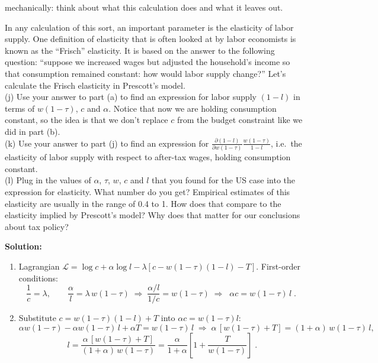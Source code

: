 \documentclass[12pt, letterpaper]{article}
\begin{document}
\begin{tcolorbox}[oddbox,title={Problem 7.5 \quad Prescott's Calculation}]
\begin{tcolorbox}[questionbox]
mechanically: think about what this calculation does and what it leaves out.
\end{tcolorbox}
\begin{tcolorbox}[questionbox,title={\textit{Question (continued)}}]
In any calculation of this sort, an important parameter is the elasticity of labor supply.
One definition of elasticity that is often looked at by labor economists is known as the
``Frisch'' elasticity. It is based on the answer to the following question: ``suppose we
increased wages but adjusted the household's income so that consumption remained constant:
how would labor supply change?'' Let's calculate the Frisch elasticity in Prescott's model.\\[3pt]
(j) Use your answer to part (a) to find an expression for labor supply $(1-l)$ in terms of
$w(1-\tau)$, $c$ and $\alpha$. Notice that now we are holding consumption constant, so the
idea is that we don't replace $c$ from the budget constraint like we did in part (b).\\
(k) Use your answer to part (j) to find an expression for
$\frac{\partial(1-l)}{\partial w(1-\tau)}\frac{w(1-\tau)}{1-l}$, i.e.\ the elasticity of labor
supply with respect to after-tax wages, holding consumption constant.\\
(l) Plug in the values of $\alpha$, $\tau$, $w$, $c$ and $l$ that you found for the US case
into the expression for elasticity. What number do you get? Empirical estimates of this
elasticity are usually in the range of 0.4 to 1. How does that compare to the elasticity
implied by Prescott's model? Why does that matter for our conclusions about tax policy?
\end{tcolorbox}

\textbf{Solution:}

\begin{enumerate}
\item Lagrangian $\mathcal L=\log c+\alpha\log l-\lambda[c-w(1-\tau)(1-l)-T]$. First-order
conditions:
\[
\frac1c=\lambda,\qquad \frac{\alpha}{l}=\lambda\,w(1-\tau)
\;\Longrightarrow\;
\frac{\alpha/l}{1/c}=w(1-\tau)
\;\Longrightarrow\;
\boxed{\;\alpha c=w(1-\tau)\,l\;}.
\]

\item Substitute $c=w(1-\tau)(1-l)+T$ into $\alpha c=w(1-\tau)l$:
\[
\alpha w(1-\tau)-\alpha w(1-\tau)\,l+\alpha T=w(1-\tau)\,l
\;\Longrightarrow\;
\alpha\,[w(1-\tau)+T]=(1+\alpha)\,w(1-\tau)\,l ,
\]
\[
\boxed{\;l=\frac{\alpha\,[w(1-\tau)+T]}{(1+\alpha)\,w(1-\tau)}
=\frac{\alpha}{1+\alpha}\left[1+\frac{T}{w(1-\tau)}\right]\;}.
\]


\end{enumerate}
\end{tcolorbox}
\end{document}
